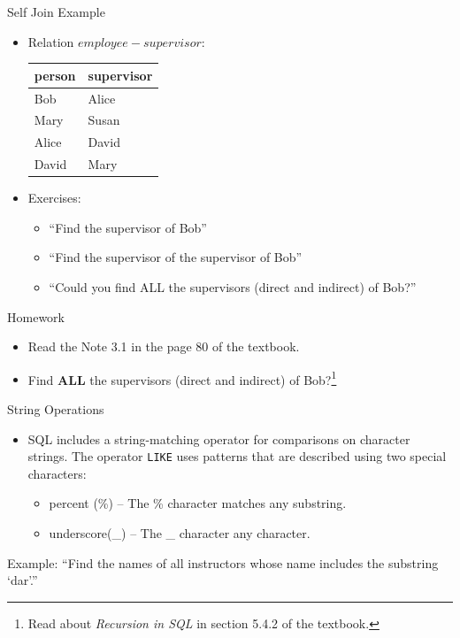 \documentclass[aspectratio=169]{beamer}
\begin{document}
\begin{frame}{Self Join Example}
    \begin{itemize}
        \item Relation $employee-supervisor$: \\
            \begin{center}
                \begin{tabular}{| l | l |}
                    \hline
                    \textbf{person} & \textbf{supervisor} \\
                    \hline
                    Bob & Alice \\ \hline
                    Mary & Susan \\ \hline
                    Alice & David \\ \hline
                    David & Mary \\ \hline
                \end{tabular}
            \end{center}
        \item Exercises:
        \begin{itemize}
            \item ``Find the supervisor of Bob''
            \item ``Find the supervisor of the supervisor of Bob''
            \item ``Could you find ALL the supervisors (direct and indirect) of Bob?''
        \end{itemize}
    \end{itemize}
\end{frame}

\begin{frame}{Homework}
    \begin{itemize}
        \item Read the Note 3.1 in the page 80 of the textbook.
        \item Find \textbf{ALL} the supervisors (direct and indirect) of Bob?\footnote{Read about \textit{Recursion in SQL} in section 5.4.2 of the textbook. }
    \end{itemize}
\end{frame}

\begin{frame}[fragile]{String Operations}
    \begin{itemize}
        \item SQL includes a string-matching operator for comparisons on character strings.  The operator \texttt{LIKE} uses patterns that are described using two special characters:
        \begin{itemize}
            \item percent (\%) -- The \% character matches any substring.
            \item underscore(\_) -- The \_ character any character.
        \end{itemize}
    \end{itemize}
    \begin{exampleblock}{Example:}
        ``Find the names of all instructors whose name includes the substring `dar'.''
    \end{exampleblock}
\end{frame}
\end{document}
